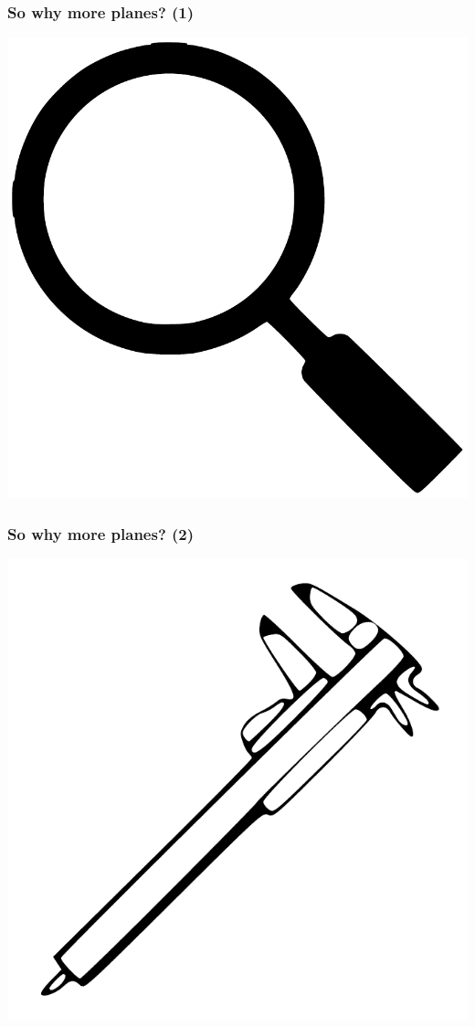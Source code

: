 \documentclass[20pt]{beamer}
\begin{document}
\begin{frame}
\frametitle{So why more planes? (1)}
\begin{center}
\includegraphics[]{Figures/MagnifyingGlass.pdf}
\end{center}
\end{frame}
\begin{frame}
\frametitle{So why more planes? (2)}
\begin{center}
\includegraphics[scale=1.4]{Figures/Calipers.pdf}
\end{center}
\end{frame}
\end{document}

